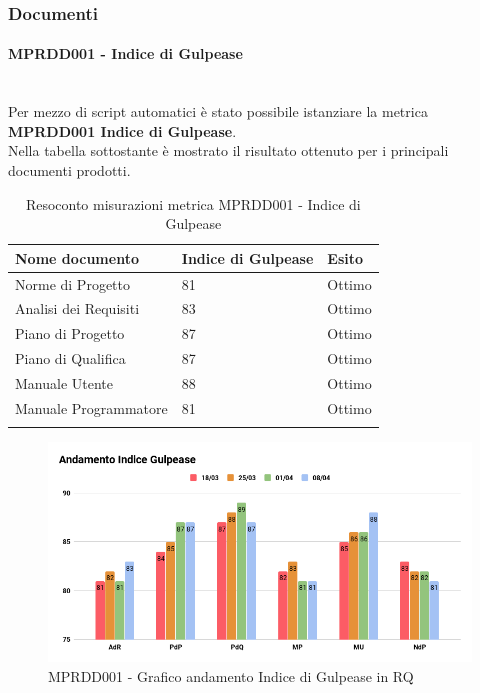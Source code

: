 \subsubsection{Documenti}
\paragraph{MPRDD001 - Indice di Gulpease}\mbox{}\\[0.4cm]
Per mezzo di script automatici è stato possibile istanziare la metrica  \textbf{MPRDD001 Indice di Gulpease}.\\
Nella tabella sottostante è mostrato il risultato ottenuto per i principali documenti prodotti.
\begin{center}%
	\centering
	\renewcommand{\arraystretch}{1.5}
	\begin{longtable}{  p{5cm}  p{5cm} p{3cm}  }
		\rowcolor{tableHeadYellow}
		\textbf{Nome documento}   & \textbf{Indice di \mbox{Gulpease}} & \textbf{Esito} \\ 
		\endhead
		Norme di Progetto         & 81                                 & Ottimo \\
		Analisi dei Requisiti     & 83                                 & Ottimo \\
		Piano di Progetto         & 87                                & Ottimo \\
		Piano di Qualifica        & 87                                 & Ottimo \\
		Manuale Utente  	& 88 & Ottimo \\
		Manuale Programmatore & 81 & Ottimo \\
		\rowcolor{white}
		\caption{Resoconto misurazioni metrica MPRDD001 - Indice di Gulpease}
	\end{longtable}
	\begin{figure}[H]
		\centering
		\includegraphics[width=13cm,keepaspectratio]{../includes/pics/Gulpease.png}
		\caption{\label{fig:mission}MPRDD001 - Grafico andamento Indice di Gulpease in RQ}
	\end{figure}
\end{center}
